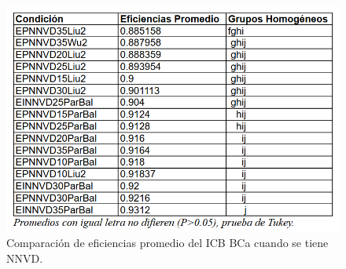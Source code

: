 \begin{figure}[ht] 
	\centering 
	\includegraphics[width=0.76\linewidth]{img/CompEfic_PromICB_BCa_NNVD.png} 
	\caption{Comparación de eficiencias promedio del ICB BCa cuando se tiene NNVD.} 
	\label{fig:CompEfic_PromICB_BCa_NNVD}
\end{figure}
\FloatBarrier



